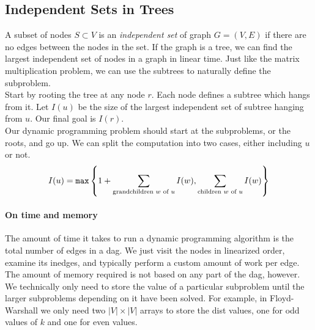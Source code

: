 \subsection{Independent Sets in Trees}
A subset of nodes $S \subset V$ is an \textit{independent set} of graph $G = (V, E)$ if there are no edges between the nodes in the set.
If the graph is a tree, we can find the largest independent set of nodes in a graph in linear time.
Just like the matrix multiplication problem, we can use the subtrees to naturally define the subproblem.\\
Start by rooting the tree at any node $r$.
Each node defines a subtree which hangs from it.
Let $I(u)$ be the size of the largest independent set of subtree hanging from $u$.
Our final goal is $I(r)$.\\
Our dynamic programming problem should start at the subproblems, or the roots, and go up.
We can split the computation into two cases, either including $u$ or not.
$$I(u) = \verb|max|\left\{1 + \sum_{\text{grandchildren $w$ of $u$}} I(w), \sum_{\text{children $w$ of $u$}} I(w)\right\}$$

\paragraph{On time and memory}
The amount of time it takes to run a dynamic programming algorithm is the total number of edges in a dag.
We just visit the nodes in linearized order, examine its inedges, and typically perform a custom amount of work per edge.
The amount of memory required is not based on any part of the dag, however.
We technically only need to store the value of a particular subproblem until the larger subproblems depending on it have been solved.
For example, in Floyd-Warshall we only need two $|V| \times |V|$ arrays to store the dist values, one for odd values of $k$ and one for even values.


